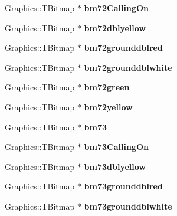 \begin{DoxyCompactItemize}
Graphics\+::\+T\+Bitmap $\ast$ {\bfseries bm72\+Calling\+On}
\item 
\mbox{\label{class_t_rail_graphics_a6638edc56cc369cfc370985abf0d799a}} 
Graphics\+::\+T\+Bitmap $\ast$ {\bfseries bm72dblyellow}
\item 
\mbox{\label{class_t_rail_graphics_a70330038b72d78047a61d0f8588c025b}} 
Graphics\+::\+T\+Bitmap $\ast$ {\bfseries bm72grounddblred}
\item 
\mbox{\label{class_t_rail_graphics_a3563e64d2d013985706d75a79a6e4ff2}} 
Graphics\+::\+T\+Bitmap $\ast$ {\bfseries bm72grounddblwhite}
\item 
\mbox{\label{class_t_rail_graphics_aa134b8a4ffcc92a8edb99301906fabe1}} 
Graphics\+::\+T\+Bitmap $\ast$ {\bfseries bm72green}
\item 
\mbox{\label{class_t_rail_graphics_a52f4922c85061b33a8139ecbdb2b097e}} 
Graphics\+::\+T\+Bitmap $\ast$ {\bfseries bm72yellow}
\item 
\mbox{\label{class_t_rail_graphics_afba6ab0881ab4552fc05daeb26a14f97}} 
Graphics\+::\+T\+Bitmap $\ast$ {\bfseries bm73}
\item 
\mbox{\label{class_t_rail_graphics_a81bbd1c90910c4eb365291807e1bd4c1}} 
Graphics\+::\+T\+Bitmap $\ast$ {\bfseries bm73\+Calling\+On}
\item 
\mbox{\label{class_t_rail_graphics_a755abe25dc24b8ca47c26624af73fee0}} 
Graphics\+::\+T\+Bitmap $\ast$ {\bfseries bm73dblyellow}
\item 
\mbox{\label{class_t_rail_graphics_aebe61ce49de40e6ba9112f9044c431b7}} 
Graphics\+::\+T\+Bitmap $\ast$ {\bfseries bm73grounddblred}
\item 
\mbox{\label{class_t_rail_graphics_a9e49537e053c200389528c1a31e5d358}} 
Graphics\+::\+T\+Bitmap $\ast$ {\bfseries bm73grounddblwhite}
\item 
\mbox{\label{class_t_rail_graphics_a8bcc3224cd8f0702cd6e12f4ec505424}} 

\end{DoxyCompactItemize}
